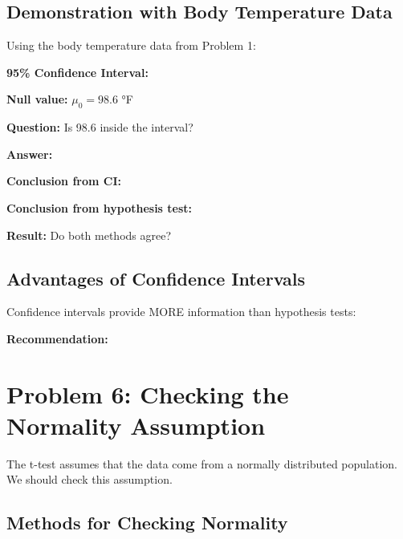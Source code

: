\documentclass[11pt]{article}
\begin{document}
\subsection*{Demonstration with Body Temperature Data}

Using the body temperature data from Problem 1:

\textbf{95\% Confidence Interval:}

\vspace{1cm}

\textbf{Null value:} $\mu_0 = 98.6$ °F

\textbf{Question:} Is 98.6 inside the interval?

\vspace{1cm}

\textbf{Answer:}

\vspace{1cm}

\textbf{Conclusion from CI:}

\vspace{2cm}

\textbf{Conclusion from hypothesis test:}

\vspace{2cm}

\textbf{Result:} Do both methods agree?

\vspace{1cm}

\subsection*{Advantages of Confidence Intervals}

Confidence intervals provide MORE information than hypothesis tests:

\vspace{5cm}

\textbf{Recommendation:}

\vspace{1cm}

\pagebreak

\section*{Problem 6: Checking the Normality Assumption}

The t-test assumes that the data come from a normally distributed population. We should check this assumption.

\subsection*{Methods for Checking Normality}
\end{document}
